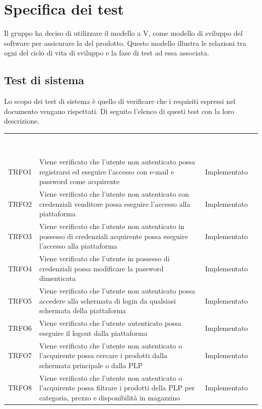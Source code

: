 \section{Specifica dei test}
\label{specificatest}
Il gruppo ha deciso di utilizzare il modello a V, come modello di sviluppo del software per assicurare la  del prodotto. Questo modello illustra le relazioni tra ogni  del ciclo di vita di sviluppo e la fase di test ad essa associata.
\subsection{Test di sistema}
Lo scopo dei test di sistema è quello di verificare che i requisiti espressi nel documento  vengano rispettati. Di seguito l'elenco di questi test con la loro descrizione.
\begin{longtable}{|c| C{10cm} |C{3cm}|}
	\textcolor{white}{\textbf{ID Test}}&
	\textcolor{white}{\textbf{Descrizione}}&
	\textcolor{white}{\textbf{Implementato}}\label{tab:TestSistema1}\\
	TRFO1 & Viene verificato che l'utente non autenticato possa registrarsi ed eseguire l'accesso  con e-mail e password come acquirente & Implementato\\ \hline
	TRFO2 & Viene verificato che l'utente non autenticato con credenziali venditore possa eseguire l'accesso alla piattaforma & Implementato\\ \hline
	TRFO3 & Viene verificato che l'utente non autenticato in possesso di credenziali acquirente possa eseguire l'accesso alla piattaforma & Implementato \\ \hline
	TRFO4 & Viene verificato che l'utente in possesso di credenziali possa modificare la password dimenticata & Implementato\\ \hline
	TRFO5 & Viene verificato che l'utente non autenticato possa accedere alla schermata di login da qualsiasi schermata della piattaforma & Implementato\\ \hline
	TRFO6 & Viene verificato che l'utente autenticato possa eseguire il logout dalla piattaforma & Implementato\\ \hline
	TRFO7 & Viene verificato che l'utente non autenticato o l'acquirente possa cercare i prodotti dalla schermata principale o dalla PLP & Implementato\\ \hline
	TRFO8 & Viene verificato che l'utente non autenticato o l'acquirente possa filtrare i prodotti della PLP per categoria, prezzo e disponibilità in magazzino & Implementato\\ \hline

\end{longtable}
